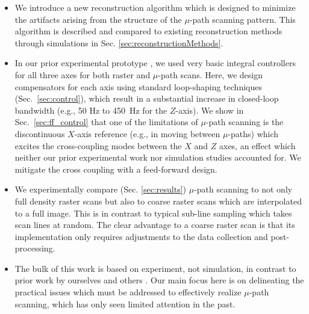 \documentclass[journal]{IEEEtran}
\begin{document}
\begin{itemize}
\item We introduce a new reconstruction algorithm which is designed to
minimize the artifacts arising from the structure of the $\mu$-path
scanning pattern. This algorithm is described and compared to existing
reconstruction methods through simulations in Sec. \ref{sec:reconstructionMethods}.
\item In our prior experimental prototype \cite{braker_hardware_2018}, we used very basic integral controllers for all three axes for both raster and $\mu$-path scans. Here, we design compensators for each axis using standard loop-shaping techniques (Sec.~\ref{sec:control}), which result in a substantial increase in closed-loop bandwidth (e.g., 50 Hz to 450~Hz for the $Z$-axis).
We show in Sec.~\ref{sec:ff_control} that one of the limitations of $\mu$-path scanning is the discontinuous $X$-axis reference (e.g., in moving between $\mu$-paths) which excites the cross-coupling modes between the $X$ and $Z$ axes, an effect which neither our prior experimental work nor simulation studies accounted for. We mitigate the cross coupling with a feed-forward design.
\item We experimentally compare (Sec. \ref{sec:results}) $\mu$-path scanning to not only full density raster scans but also to coarse raster scans which are interpolated to a full image. This is in contrast to typical sub-line sampling which takes scan lines at random. The clear advantage to a coarse raster scan is that its implementation only requires adjustments to the data collection and post-processing. 
\item The bulk of this work is based on experiment, not simulation, in contrast to prior work by ourselves \cite{luo2015comparison,maxwell2014compressed} and others \cite{han_optimal_2018,jensen_reconstruction_2013,oxvig_structure_2017}. Our main focus here is on delineating the practical issues which must be addressed to effectively realize $\mu$-path scanning, which has only seen limited attention in the past.
\end{itemize}
\end{document}
